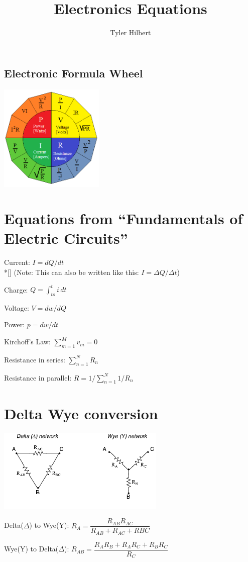\documentclass{article}
\newcommand{\forceindent}{\leavevmode{\parindent=3em\indent}}
\begin{document}
	\title{Electronics Equations}
	\author{Tyler Hilbert}
	\date{}
	\maketitle

	\subsection*{Electronic Formula Wheel}
	\includegraphics[width=50mm]{FormulaWheel.png}

	\section*{Equations from ``Fundamentals of Electric Circuits''}

	Current: $I = dQ/dt$ \\*[\smallskipamount]
	\forceindent (Note: This can also be written like this: $I = \Delta Q / \Delta t$)
	
	Charge: $Q = \int_{to}^{t} i\,dt$

	Voltage: $V = dw/dQ$

	Power: $p = dw/dt$
	
	
	Kirchoff's Law: $\sum\limits_{m=1}^{M} v_{m} = 0$ 
	
	Resistance in series: $\sum\limits_{n=1}^{N} R_{n}$
	
	Resistance in parallel: $R = 1/\sum\limits_{n=1}^{N} 1/R_{n}$
	
	\section*{Delta Wye conversion}
	\includegraphics[width=80mm]{DeltaWye.png}
	
	Delta($\Delta$) to Wye(Y): $R_{A} = \dfrac{R_{AB}R_{AC}}{R_{AB}+R_{AC}+R{BC}}$
	
	Wye(Y) to Delta($\Delta$): $R_{AB} = \dfrac{R_{A}R_{B} + R_{A}R_{C} + R_{B}R_{C}} {R_{C}} $

	
	
\end{document}
